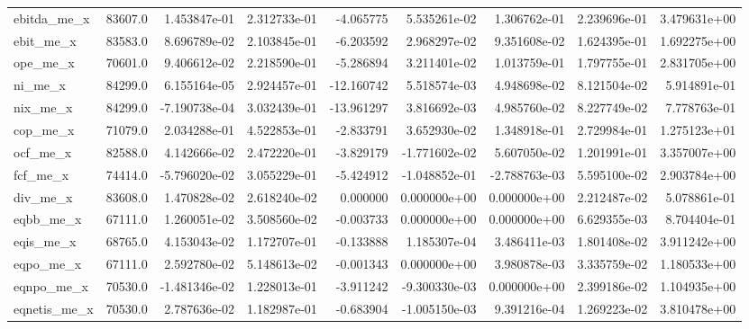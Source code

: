 \documentclass[10pt]{article}
\begin{document}
\begin{landscape}
\begin{longtable}{lrrrrrrrr}
ebitda\_me\_x             &   83607.0 &  1.453847e-01 &  2.312733e-01 &     -4.065775 &  5.535261e-02 &  1.306762e-01 &  2.239696e-01 &  3.479631e+00 \\
ebit\_me\_x               &   83583.0 &  8.696789e-02 &  2.103845e-01 &     -6.203592 &  2.968297e-02 &  9.351608e-02 &  1.624395e-01 &  1.692275e+00 \\
ope\_me\_x                &   70601.0 &  9.406612e-02 &  2.218590e-01 &     -5.286894 &  3.211401e-02 &  1.013759e-01 &  1.797755e-01 &  2.831705e+00 \\
ni\_me\_x                 &   84299.0 &  6.155164e-05 &  2.924457e-01 &    -12.160742 &  5.518574e-03 &  4.948698e-02 &  8.121504e-02 &  5.914891e-01 \\
nix\_me\_x                &   84299.0 & -7.190738e-04 &  3.032439e-01 &    -13.961297 &  3.816692e-03 &  4.985760e-02 &  8.227749e-02 &  7.778763e-01 \\
cop\_me\_x                &   71079.0 &  2.034288e-01 &  4.522853e-01 &     -2.833791 &  3.652930e-02 &  1.348918e-01 &  2.729984e-01 &  1.275123e+01 \\
ocf\_me\_x                &   82588.0 &  4.142666e-02 &  2.472220e-01 &     -3.829179 & -1.771602e-02 &  5.607050e-02 &  1.201991e-01 &  3.357007e+00 \\
fcf\_me\_x                &   74414.0 & -5.796020e-02 &  3.055229e-01 &     -5.424912 & -1.048852e-01 & -2.788763e-03 &  5.595100e-02 &  2.903784e+00 \\
div\_me\_x                &   83608.0 &  1.470828e-02 &  2.618240e-02 &      0.000000 &  0.000000e+00 &  0.000000e+00 &  2.212487e-02 &  5.078861e-01 \\
eqbb\_me\_x               &   67111.0 &  1.260051e-02 &  3.508560e-02 &     -0.003733 &  0.000000e+00 &  0.000000e+00 &  6.629355e-03 &  8.704404e-01 \\
eqis\_me\_x               &   68765.0 &  4.153043e-02 &  1.172707e-01 &     -0.133888 &  1.185307e-04 &  3.486411e-03 &  1.801408e-02 &  3.911242e+00 \\
eqpo\_me\_x               &   67111.0 &  2.592780e-02 &  5.148613e-02 &     -0.001343 &  0.000000e+00 &  3.980878e-03 &  3.335759e-02 &  1.180533e+00 \\
eqnpo\_me\_x              &   70530.0 & -1.481346e-02 &  1.228013e-01 &     -3.911242 & -9.300330e-03 &  0.000000e+00 &  2.399186e-02 &  1.104935e+00 \\
eqnetis\_me\_x            &   70530.0 &  2.787636e-02 &  1.182987e-01 &     -0.683904 & -1.005150e-03 &  9.391216e-04 &  1.269223e-02 &  3.810478e+00 \\

\end{longtable}
\end{landscape}
\end{document}
